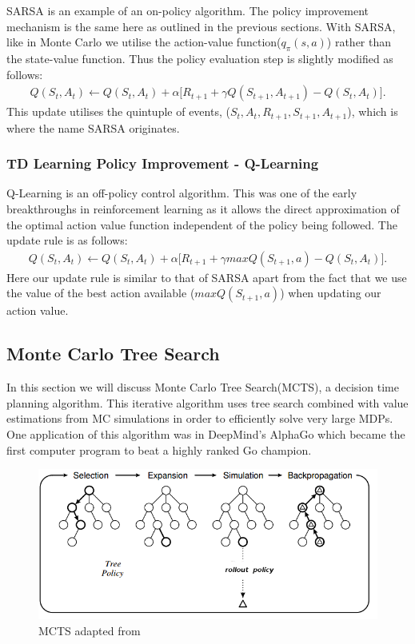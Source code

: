 SARSA is an example of an on-policy algorithm.
The policy improvement mechanism is the same here as outlined in the previous sections.
With SARSA, like in Monte Carlo we utilise the action-value function($q_{\pi}(s, a)$) rather
than the state-value function.
Thus the policy evaluation step is slightly modified as follows:
\begin{align}
    Q(S_t, A_t) \leftarrow Q(S_t, A_t) + \alpha \lbrack R_{t+1} + \gamma Q(S_{t+1}, A_{t+1}) - Q(S_t, A_t) \rbrack.
\end{align}
This update utilises the quintuple of events, ($S_t, A_t, R_{t+1}, S_{t+1}, A_{t+1}$), which is where the
name SARSA originates.


\subsubsection{TD Learning Policy Improvement - Q-Learning}
Q-Learning is an off-policy control algorithm.
This was one of the early breakthroughs in reinforcement learning as it allows the direct approximation of
the optimal action value function independent of the policy being followed.
The update rule is as follows:
\begin{align}
    Q(S_t, A_t) \leftarrow Q(S_t, A_t) + \alpha \lbrack R_{t+1} + \gamma maxQ(S_{t+1}, a) - Q(S_t, A_t) \rbrack.
\end{align}
Here our update rule is similar to that of SARSA apart from the fact that we use the value of the best
action available ($maxQ(S_{t+1}, a)$) when updating our action value.

\subsection{Monte Carlo Tree Search}\label{subsec:mcts}
In this section we will discuss Monte Carlo Tree Search(MCTS), a decision time planning algorithm.
This iterative algorithm uses tree search combined with value estimations from MC simulations in order to
efficiently solve very large MDPs.
One application of this algorithm was in DeepMind's AlphaGo\citep{silver2016mastering} which became the
first computer program to beat a highly ranked Go champion.

\begin{figure}[!ht]
    \includegraphics[scale=.8]{images/MCTS.png}
    \caption{MCTS adapted from\citep{lim2016field}}
\end{figure}

